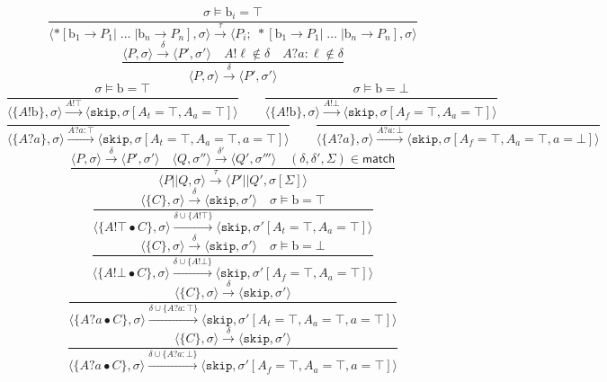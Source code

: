 \documentclass[times, 10pt]{article}
\begin{document}
$$    \frac{\sigma \models \mathrm{b}_i = \top} {\langle *[ \mathrm{b}_1 \rightarrow P_1  | \; \ldots \; | \mathrm{b}_n \rightarrow P_n ] , \sigma \rangle \xrightarrow{\tau} \langle P_i;\;*[ \mathrm{b}_1 \rightarrow P_1  | \; \ldots \; | \mathrm{b}_n \rightarrow P_n ] , \sigma\rangle  } $$$$
    \frac{\langle P, \sigma \rangle \xrightarrow{\delta} \langle P', \sigma' \rangle \quad A!\ell \not \in \delta \quad A?a:\ell \not \in \delta}{\langle P, \sigma \rangle \xrightarrow{\delta} \langle P', \sigma' \rangle} $$$$
    \frac{\sigma \models \mathrm{b} = \top}{\langle \{A!\mathrm{b}\}, \sigma \rangle \xrightarrow{A!\top} \langle \mathtt{skip}, \sigma[A_t = \top, A_a = \top] \rangle} \qquad
    \frac{\sigma \models \mathrm{b} = \bot}{\langle \{A!\mathrm{b}\}, \sigma \rangle \xrightarrow{A!\bot} \langle \mathtt{skip}, \sigma[A_f = \top, A_a = \top] \rangle} $$$$
    \frac{}{\langle \{A?a\}, \sigma \rangle \xrightarrow{A?a : \top} \langle \mathtt{skip}, \sigma[A_t = \top, A_a = \top, a = \top] \rangle} \qquad
    \frac{}{\langle \{A?a\}, \sigma \rangle \xrightarrow{A?a : \bot} \langle \mathtt{skip}, \sigma[A_f = \top, A_a = \top, a = \bot] \rangle} $$$$
    \frac{\langle P, \sigma \rangle \xrightarrow{\delta} \langle P', \sigma' \rangle \quad \langle Q, \sigma'' \rangle \xrightarrow{\delta'} \langle Q', \sigma''' \rangle \quad (\delta, \delta', \Sigma) \in \mathsf{match}}{\langle P || Q, \sigma \rangle \xrightarrow{\tau} \langle P' || Q', \sigma[\Sigma] \rangle} $$$$
    \frac{\langle \{C\}, \sigma \rangle \xrightarrow{\delta} \langle \mathtt{skip}, \sigma' \rangle \quad \sigma \models \mathrm{b} = \top}{\langle \{A!\top \bullet C\}, \sigma \rangle \xrightarrow{\delta \cup \{A!\top\}} \langle \mathtt{skip}, \sigma'[A_t = \top, A_a = \top] \rangle} $$$$
    \frac{\langle \{C\}, \sigma \rangle \xrightarrow{\delta} \langle \mathtt{skip}, \sigma' \rangle \quad \sigma \models \mathrm{b} = \bot}{\langle \{A!\bot \bullet C\}, \sigma \rangle \xrightarrow{\delta \cup \{A!\bot\}} \langle \mathtt{skip}, \sigma'[A_f = \top, A_a = \top] \rangle} $$$$
    \frac{\langle \{C\}, \sigma \rangle \xrightarrow{\delta} \langle \mathtt{skip}, \sigma' \rangle}{\langle \{A?a \bullet C\}, \sigma \rangle \xrightarrow{\delta \cup \{A?a : \top\}} \langle \mathtt{skip}, \sigma'[A_t = \top, A_a = \top, a = \top] \rangle} $$$$
    \frac{\langle \{C\}, \sigma \rangle \xrightarrow{\delta} \langle \mathtt{skip}, \sigma' \rangle}{\langle \{A?a \bullet C\}, \sigma \rangle \xrightarrow{\delta \cup \{A?a : \bot\}} \langle \mathtt{skip}, \sigma'[A_f = \top, A_a = \top, a = \top] \rangle} $$$$
$$
\end{document}
